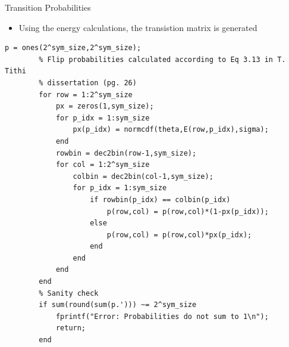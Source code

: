 \documentclass[10pt,ignorenonframetext,]{beamer}
\providecommand{\tightlist}{%
  \setlength{\itemsep}{0pt}\setlength{\parskip}{0pt}}
\begin{document}
\begin{frame}[fragile]{Transition Probabilities}
\protect\hypertarget{transition-probabilities}{}
\begin{itemize}[<+->]
\tightlist
\item
  Using the energy calculations, the transistion matrix is generated
\end{itemize}

\begin{verbatim}
p = ones(2^sym_size,2^sym_size);
        % Flip probabilities calculated according to Eq 3.13 in T. Tithi
        % dissertation (pg. 26)
        for row = 1:2^sym_size
            px = zeros(1,sym_size);
            for p_idx = 1:sym_size
                px(p_idx) = normcdf(theta,E(row,p_idx),sigma);
            end
            rowbin = dec2bin(row-1,sym_size);
            for col = 1:2^sym_size
                colbin = dec2bin(col-1,sym_size);
                for p_idx = 1:sym_size
                    if rowbin(p_idx) == colbin(p_idx)
                        p(row,col) = p(row,col)*(1-px(p_idx));
                    else
                        p(row,col) = p(row,col)*px(p_idx);
                    end
                end
            end
        end
        % Sanity check
        if sum(round(sum(p.'))) ~= 2^sym_size
            fprintf("Error: Probabilities do not sum to 1\n");
            return;
        end
\end{verbatim}
\end{frame}
\end{document}

